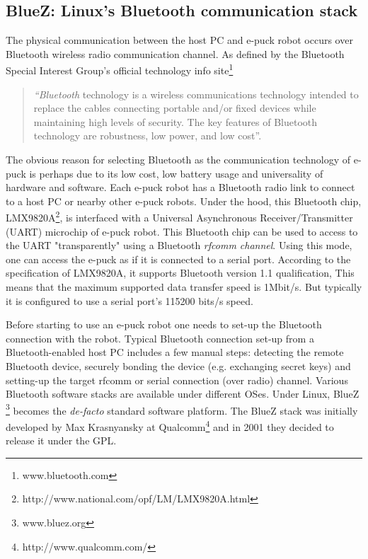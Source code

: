\subsection{BlueZ: Linux's Bluetooth communication stack}
\label{expt-tools:bluez}
The physical communication between the host PC and e-puck robot occurs over Bluetooth wireless radio communication channel.  As defined by the Bluetooth Special Interest Group's official technology  info site\footnote{www.bluetooth.com}
 \begin{quote}
 \ssp
{\em ``Bluetooth} technology is a wireless communications technology intended to replace the cables connecting portable and/or fixed devices while maintaining high levels of security. The key features of Bluetooth technology are robustness, low power, and low cost''.
\end{quote}
\sdp
The obvious reason for selecting Bluetooth as the communication technology of e-puck is perhaps   due to its low cost, low battery usage and universality of hardware and software. Each e-puck robot has a Bluetooth radio link to connect to a host PC or nearby other e-puck robots. Under the hood,  this Bluetooth  chip, LMX9820A\footnote{http://www.national.com/opf/LM/LMX9820A.html},   is  interfaced with a Universal Asynchronous Receiver/Transmitter (UART)  microchip of e-puck robot. This Bluetooth chip can be used to access to the UART "transparently" using a Bluetooth \textit{rfcomm channel}. Using this mode, one can access the e-puck as if it is connected to a serial port.  According to the specification of LMX9820A, it supports Bluetooth version 1.1 qualification, This means that the maximum supported data transfer speed is 1Mbit/s. But typically it is configured to use a serial port's 115200 bits/s speed.

Before starting to use an e-puck robot  one needs to set-up the Bluetooth connection with the robot. Typical Bluetooth connection set-up from a Bluetooth-enabled host PC includes a few manual steps:  detecting the remote Bluetooth device, securely bonding the device (e.g.  exchanging secret keys) and setting-up the target rfcomm or serial connection (over radio) channel. Various Bluetooth software stacks are available under different OSes. Under Linux, BlueZ \footnote{www.bluez.org} becomes the {\em de-facto} standard software platform. The BlueZ stack was initially developed by Max Krasnyansky at Qualcomm\footnote{http://www.qualcomm.com/} and in 2001  they decided to release it under the GPL.

